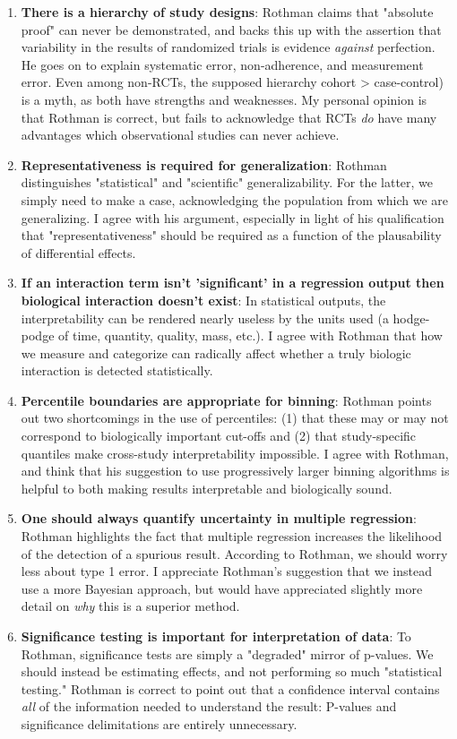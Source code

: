 \documentclass[11pt]{article}
\begin{document}
\begin{multicols}{2}
\begin{enumerate}
\item \textbf{There is a hierarchy of study designs}: Rothman claims that "absolute proof" can never be demonstrated, and backs this up with the assertion that variability in the results of randomized trials is evidence \emph{against} perfection.  He goes on to explain systematic error, non-adherence, and measurement error.  Even among non-RCTs, the supposed hierarchy cohort > case-control) is a myth, as both have strengths and weaknesses. My personal opinion is that Rothman is correct, but fails to acknowledge that RCTs \emph{do} have many advantages which observational studies can never achieve.
\item \textbf{Representativeness is required for generalization}: Rothman distinguishes "statistical" and "scientific" generalizability. For the latter, we simply need to make a case, acknowledging the population from which we are generalizing.  I agree with his argument, especially in light of his qualification that "representativeness" should be required as a function of the plausability of differential effects. 
\item \textbf{If an interaction term isn't 'significant' in a regression output then biological interaction doesn't exist}: In statistical outputs, the interpretability can be rendered nearly useless by the units used (a hodge-podge of time, quantity, quality, mass, etc.).  I agree with Rothman that how we measure and categorize can radically affect whether a truly biologic interaction is detected statistically.
\item \textbf{Percentile boundaries are appropriate for binning}: Rothman points out two shortcomings in the use of percentiles: (1) that these may or may not correspond to biologically important cut-offs and (2) that study-specific quantiles make cross-study interpretability impossible. I agree with Rothman, and think that his suggestion to use progressively larger binning algorithms is helpful to both making results interpretable and biologically sound.
\item \textbf{One should always quantify uncertainty in multiple regression}: Rothman highlights the fact that multiple regression increases the likelihood of the detection of a spurious result. According to Rothman, we should worry less about type 1 error. I appreciate Rothman's suggestion that we instead use a more Bayesian approach, but would have appreciated slightly more detail on \emph{why} this is a superior method. 
\item \textbf{Significance testing is important for interpretation of data}: To Rothman, significance tests are simply a "degraded" mirror of p-values.  We should instead be estimating effects, and not performing so much "statistical testing." Rothman is correct to point out that a confidence interval contains \emph{all} of the information needed to understand the result: P-values and significance delimitations are entirely unnecessary. 
\end{enumerate}


\end{multicols}
\end{document}

